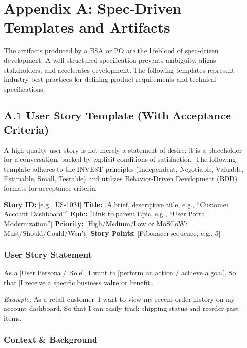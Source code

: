 \documentclass[
  11pt,
  openany,
  oneside]{book}
\begin{document}
\section{Appendix A: Spec-Driven Templates and
Artifacts}\label{appendix-a-spec-driven-templates-and-artifacts}

The artifacts produced by a BSA or PO are the lifeblood of spec-driven
development. A well-structured specification prevents ambiguity, aligns
stakeholders, and accelerates development. The following templates
represent industry best practices for defining product requirements and
technical specifications.

\subsection{A.1 User Story Template (With Acceptance
Criteria)}\label{a.1-user-story-template-with-acceptance-criteria}

A high-quality user story is not merely a statement of desire; it is a
placeholder for a conversation, backed by explicit conditions of
satisfaction. The following template adheres to the INVEST principles
(Independent, Negotiable, Valuable, Estimable, Small, Testable) and
utilizes Behavior-Driven Development (BDD) formats for acceptance
criteria.

\textbf{Story ID:} {[}e.g., US-1024{]} \textbf{Title:} {[}A brief,
descriptive title, e.g., ``Customer Account Dashboard''{]}
\textbf{Epic:} {[}Link to parent Epic, e.g., ``User Portal
Modernization''{]} \textbf{Priority:} {[}High/Medium/Low or MoSCoW:
Must/Should/Could/Won't{]} \textbf{Story Points:} {[}Fibonacci sequence,
e.g., 5{]}

\subsubsection{User Story Statement}\label{user-story-statement}

As a {[}User Persona / Role{]}, I want to {[}perform an action / achieve
a goal{]}, So that {[}I receive a specific business value or benefit{]}.

\emph{Example:} As a retail customer, I want to view my recent order
history on my account dashboard, So that I can easily track shipping
status and reorder past items.

\subsubsection{Context \& Background}\label{context-background}
\end{document}
